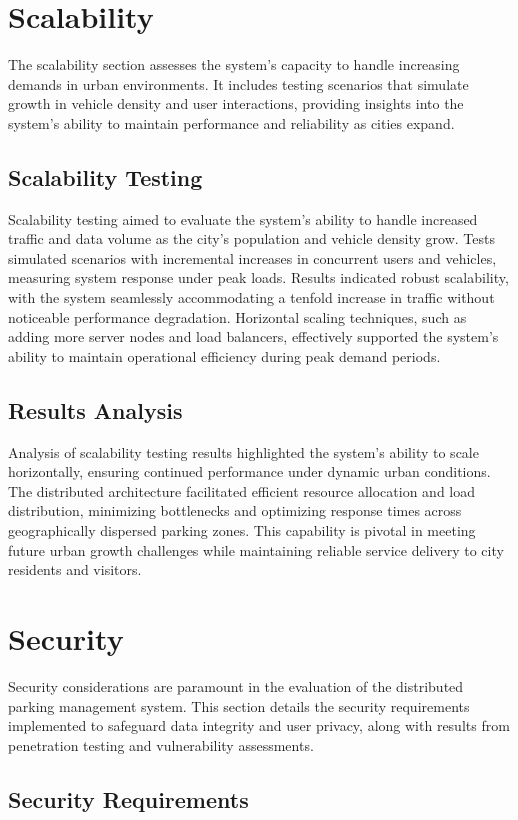 \documentclass[oneside, 12pt, a4paper]{book}
\begin{document}
\chapter{Scalability}
The scalability section assesses the system's capacity to handle increasing demands in urban environments. It includes testing scenarios that simulate growth in vehicle density and user interactions, providing insights into the system's ability to maintain performance and reliability as cities expand.
\section{Scalability Testing}

Scalability testing aimed to evaluate the system's ability to handle increased traffic and data volume as the city's population and vehicle density grow. Tests simulated scenarios with incremental increases in concurrent users and vehicles, measuring system response under peak loads. Results indicated robust scalability, with the system seamlessly accommodating a tenfold increase in traffic without noticeable performance degradation. Horizontal scaling techniques, such as adding more server nodes and load balancers, effectively supported the system's ability to maintain operational efficiency during peak demand periods.
\section{Results Analysis}

Analysis of scalability testing results highlighted the system's ability to scale horizontally, ensuring continued performance under dynamic urban conditions. The distributed architecture facilitated efficient resource allocation and load distribution, minimizing bottlenecks and optimizing response times across geographically dispersed parking zones. This capability is pivotal in meeting future urban growth challenges while maintaining reliable service delivery to city residents and visitors.
\chapter{Security}
Security considerations are paramount in the evaluation of the distributed parking management system. This section details the security requirements implemented to safeguard data integrity and user privacy, along with results from penetration testing and vulnerability assessments.
\section{Security Requirements}
\end{document}
